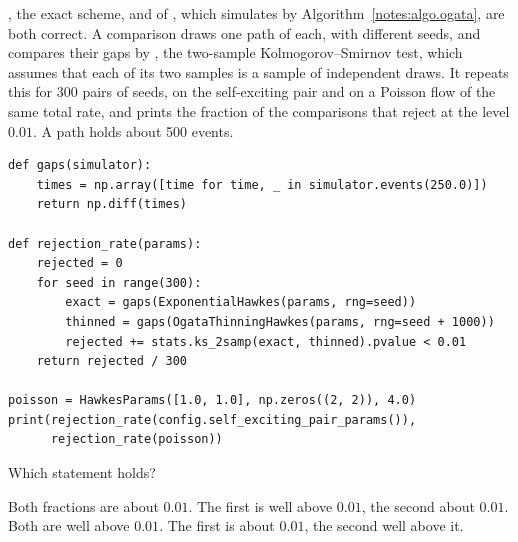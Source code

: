 \begin{question}
\label{question.twoSampleTestOnTheGapsOfOnePath}
, the exact scheme,
and  of ,
which simulates by Algorithm~\ref{notes:algo.ogata},
are both correct.
A comparison draws one path of each, with different seeds,
and compares their gaps by ,
the two-sample Kolmogorov--Smirnov test,
which assumes that each of its two samples is a sample of independent draws.
It repeats this for 300 pairs of seeds,
on the self-exciting pair and on a Poisson flow of the same total rate,
and prints the fraction of the comparisons that reject at the level $0.01$.
A path holds about 500 events.
\begin{lstlisting}[caption={The rejection rate of a comparison of gaps}, label=listing.twoSampleOnGaps]
def gaps(simulator):
    times = np.array([time for time, _ in simulator.events(250.0)])
    return np.diff(times)

def rejection_rate(params):
    rejected = 0
    for seed in range(300):
        exact = gaps(ExponentialHawkes(params, rng=seed))
        thinned = gaps(OgataThinningHawkes(params, rng=seed + 1000))
        rejected += stats.ks_2samp(exact, thinned).pvalue < 0.01
    return rejected / 300

poisson = HawkesParams([1.0, 1.0], np.zeros((2, 2)), 4.0)
print(rejection_rate(config.self_exciting_pair_params()),
      rejection_rate(poisson))
\end{lstlisting}
Which statement holds?
\begin{choices}
 \choice Both fractions are about $0.01$.
 \correctchoice The first is well above $0.01$, the second about $0.01$.
 \choice Both are well above $0.01$.
 \choice The first is about $0.01$, the second well above it.
\end{choices}
\end{question}
